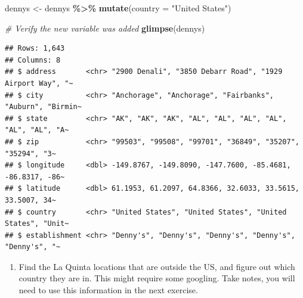 \documentclass[
]{article}
\newenvironment{Shaded}{\begin{snugshade}}{\end{snugshade}}
\newcommand{\AttributeTok}[1]{\textcolor[rgb]{0.13,0.29,0.53}{#1}}
\newcommand{\CommentTok}[1]{\textcolor[rgb]{0.56,0.35,0.01}{\textit{#1}}}
\newcommand{\FunctionTok}[1]{\textcolor[rgb]{0.13,0.29,0.53}{\textbf{#1}}}
\newcommand{\NormalTok}[1]{#1}
\newcommand{\OtherTok}[1]{\textcolor[rgb]{0.56,0.35,0.01}{#1}}
\newcommand{\SpecialCharTok}[1]{\textcolor[rgb]{0.81,0.36,0.00}{\textbf{#1}}}
\newcommand{\StringTok}[1]{\textcolor[rgb]{0.31,0.60,0.02}{#1}}
\providecommand{\tightlist}{%
  \setlength{\itemsep}{0pt}\setlength{\parskip}{0pt}}
\begin{document}
\begin{Shaded}
\begin{Highlighting}[]
\NormalTok{dennys }\OtherTok{\textless{}{-}}\NormalTok{ dennys }\SpecialCharTok{\%\textgreater{}\%}
  \FunctionTok{mutate}\NormalTok{(}\AttributeTok{country =} \StringTok{"United States"}\NormalTok{)}

\CommentTok{\# Verify the new variable was added}
\FunctionTok{glimpse}\NormalTok{(dennys)}
\end{Highlighting}
\end{Shaded}

\begin{verbatim}
## Rows: 1,643
## Columns: 8
## $ address       <chr> "2900 Denali", "3850 Debarr Road", "1929 Airport Way", "~
## $ city          <chr> "Anchorage", "Anchorage", "Fairbanks", "Auburn", "Birmin~
## $ state         <chr> "AK", "AK", "AK", "AL", "AL", "AL", "AL", "AL", "AL", "A~
## $ zip           <chr> "99503", "99508", "99701", "36849", "35207", "35294", "3~
## $ longitude     <dbl> -149.8767, -149.8090, -147.7600, -85.4681, -86.8317, -86~
## $ latitude      <dbl> 61.1953, 61.2097, 64.8366, 32.6033, 33.5615, 33.5007, 34~
## $ country       <chr> "United States", "United States", "United States", "Unit~
## $ establishment <chr> "Denny's", "Denny's", "Denny's", "Denny's", "Denny's", "~
\end{verbatim}

\begin{enumerate}
\def\labelenumi{\arabic{enumi}.}
\setcounter{enumi}{6}
\tightlist
\item
  Find the La Quinta locations that are outside the US, and figure out
  which country they are in. This might require some googling. Take
  notes, you will need to use this information in the next exercise.
\end{enumerate}

\begin{Shaded}
\end{Shaded}
\end{document}
